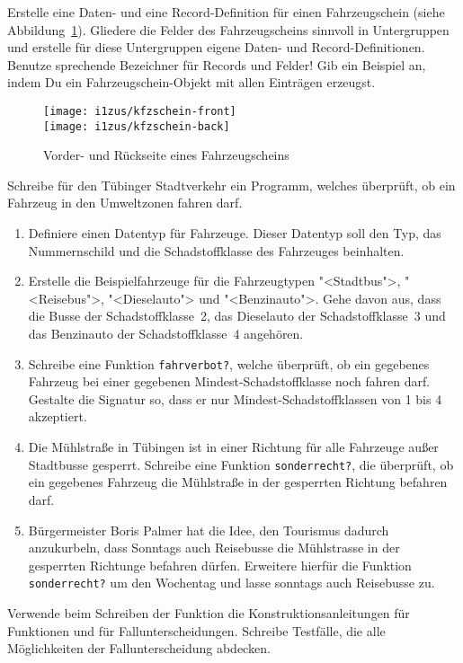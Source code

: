 \begin{aufgabe}

  Erstelle eine Daten- und eine Record-Definition für einen
    Fahrzeugschein (siehe Abbildung~\ref{fig:fahrzeugschein}).  Gliedere die Felder des
    Fahrzeugscheins sinnvoll in Untergruppen und erstelle für diese
    Untergruppen eigene Daten- und Record-Definitionen.  Benutze
    sprechende Bezeichner für Records und Felder!  Gib ein
    Beispiel an, indem Du ein Fahrzeugschein-Objekt mit allen Einträgen
    erzeugst.
    
    
    \begin{figure}[tb]
      \begin{center}
        \texttt{[image: i1zus/kfzschein-front]}\\
        \medskip
        \texttt{[image: i1zus/kfzschein-back]}
      \end{center}
      \caption{Vorder- und Rückseite eines Fahrzeugscheins}
      \label{fig:fahrzeugschein}
    \end{figure}
\end{aufgabe}

\begin{aufgabe}

  Schreibe für den Tübinger Stadtverkehr ein
  Programm, welches überprüft, ob ein Fahrzeug in den Umweltzonen fahren 
  darf.
  \begin{enumerate}
  \item Definiere einen Datentyp für Fahrzeuge. Dieser
    Datentyp soll den Typ, das Nummernschild und die Schadstoffklasse des
    Fahrzeuges beinhalten.
  \item Erstelle die Beispielfahrzeuge für die
    Fahrzeugtypen "<Stadtbus">, "<Reisebus">, "<Dieselauto">
    und "<Benzinauto">. Gehe davon aus, dass die Busse der
    Schadstoffklasse~2, das Dieselauto der Schadstoffklasse~3 und das
    Benzinauto der Schadstoffklasse~4 angehören.
  \item Schreibe eine Funktion \lstinline{fahrverbot?},
    welche überprüft, ob ein gegebenes Fahrzeug bei einer gegebenen
    Mindest-Schadstoffklasse noch fahren darf. Gestalte die Signatur
    so, dass er nur Mindest-Schadstoffklassen von 1 bis 4 akzeptiert.
  \item Die Mühlstraße in Tübingen ist in einer Richtung für
    alle Fahrzeuge außer Stadtbusse gesperrt. Schreibe eine Funktion
    \lstinline{sonderrecht?}, die überprüft, ob ein gegebenes Fahrzeug die
    Mühlstraße in der gesperrten Richtung befahren darf.  
  \item Bürgermeister Boris Palmer hat die Idee, den Tourismus
    dadurch anzukurbeln, dass Sonntags auch Reisebusse die Mühlstrasse in
    der gesperrten Richtunge befahren dürfen. Erweitere hierfür die
    Funktion \lstinline{sonderrecht?} um den Wochentag und lasse sonntags
    auch Reisebusse zu.
  \end{enumerate}
  Verwende beim Schreiben der Funktion die
  Konstruktionsanleitungen für Funktionen und für Fallunterscheidungen. 
  Schreibe Testfälle, die alle Möglichkeiten der   
  Fallunterscheidung abdecken.
  
\end{aufgabe}

